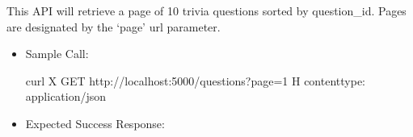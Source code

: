 \documentclass[letterpaper,10pt,english]{sphinxmanual}
\begin{document}
\begin{fulllineitems}
\label{\detokenize{index:controller.retrieve_questions}}

This API will retrieve a page of 10 trivia questions sorted by question\_id. 
Pages are designated by the ‘page’ url parameter.
\begin{itemize}
\item {} 
Sample Call:

\begin{sphinxVerbatim}[commandchars=\\\{\}]
curl \PYGZhy{}X GET http://localhost:5000/questions?page=1 
     \PYGZhy{}H \PYGZsq{}content\PYGZhy{}type: application/json\PYGZsq{}
\end{sphinxVerbatim}

\item {} 
Expected Success Response:

\begin{sphinxVerbatim}[commandchars=\\\{\}]
   


\end{sphinxVerbatim}
\end{itemize}
\end{fulllineitems}
\end{document}
